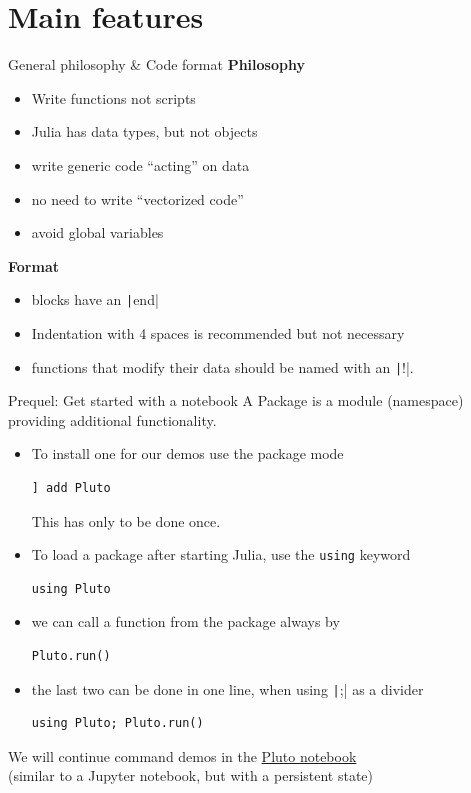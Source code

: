\documentclass[aspectratio=169, 11pt, handout]{beamer}
\begin{document}
    \section{Main features}
    \begin{frame}{General philosophy \& Code format}
        \alert{\textbf{Philosophy}}
        \begin{itemize}
            \item Write functions not scripts
            \item Julia has data types, but not objects
            \item write generic code “acting” on data
            \item no need to write “vectorized code”
            \item avoid global variables
        \end{itemize}
        \vspace{\baselineskip}
        \pause
        \alert{\textbf{Format}}
        \begin{itemize}
            \item blocks have an \texttt|end|
            \item Indentation with 4 spaces is recommended but not necessary
            \item functions that modify their data should be named with an \texttt|!|.
        \end{itemize}
    \end{frame}
    \begin{frame}[fragile]{Prequel: Get started with a notebook}
        A \alert{Package} is a \alert{module} (namespace) providing additional functionality.

        \begin{itemize}[<+->]
            \item To install one for our demos use the package mode
            \begin{verbatim}
] add Pluto
            \end{verbatim}
            This has only to be done once.
            \item To load a package after starting Julia,
            use the \texttt{using} keyword
            \begin{verbatim}
using Pluto
            \end{verbatim}
            \item we can call a function from the package always by
            \begin{verbatim}
Pluto.run()
            \end{verbatim}
            \item the last two can be done in one line, when using \texttt|;| as a divider
            \begin{verbatim}
using Pluto; Pluto.run()
            \end{verbatim}
        \end{itemize}
        \pause
        We will continue command demos in the \href{https://plutojl.org}{Pluto notebook}
        \\\hfill (similar to a Jupyter notebook, but with a persistent state)
    \end{frame}
\end{document}
